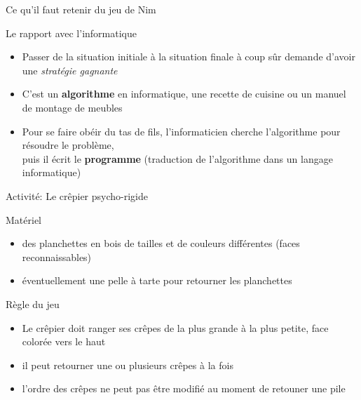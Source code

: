 \documentclass[final,hyperref={pdfpagelabels=false}]{beamer}
\begin{document}
\begin{frame}{Ce qu'il faut retenir du jeu de Nim}
  \begin{block}{Le rapport avec l'informatique}
    \begin{itemize}
    \item Passer de la situation initiale à la situation finale à coup sûr demande d'avoir
      une \textit{stratégie gagnante}
    \item C'est un \alert{\textbf{algorithme}} en informatique, une recette de
      cuisine ou un manuel de montage de meubles
    \item Pour se faire obéir du tas de fils, l'informaticien cherche
      l'algorithme pour résoudre le problème,\\
      puis il écrit le \alert{\textbf{programme}} (traduction de l'algorithme
      dans un langage informatique)
    \end{itemize}
  \end{block}
\end{frame}
\begin{frame}{Activité: Le crêpier psycho-rigide}
 
  \begin{block}{Matériel}
    \begin{itemize}
    \item des planchettes en bois de tailles et de couleurs différentes (faces reconnaissables)
    \item éventuellement une pelle à tarte pour retourner les planchettes
    \end{itemize}
  \end{block}
  
  \begin{block}{Règle du jeu}
    \begin{itemize}
    \item Le crêpier doit ranger ses crêpes de la plus grande à la plus petite,
      face colorée vers le haut
    \item il peut retourner une ou plusieurs crêpes à la fois
    \item l'ordre des crêpes ne peut pas être modifié au moment de retouner
      une pile
    \end{itemize}
  \end{block}

\end{frame}
\end{document}

